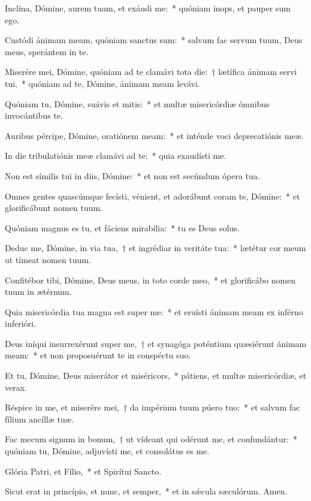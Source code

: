 \item Inclína, Dómine, aurem tuam, et exáudi me:~* quóniam inops, et pauper sum ego.

\item Custódi ánimam meam, quóniam sanctus sum:~* salvum fac servum tuum, Deus meus, sperántem in te.

\item Miserére mei, Dómine, quóniam ad te clamávi tota die:~† lætífica ánimam servi tui,~* quóniam ad te, Dómine, ánimam meam levávi.

\item Quóniam tu, Dómine, suávis et mitis:~* et multæ misericórdiæ ómnibus invocántibus te.

\item Auribus pércipe, Dómine, oratiónem meam:~* et inténde voci deprecatiónis meæ.

\item In die tribulatiónis meæ clamávi ad te:~* quia exaudísti me.

\item Non est símilis tui in diis, Dómine:~* et non est secúndum ópera tua.

\item Omnes gentes quascúmque fecísti, vénient, et adorábunt coram te, Dómine:~* et glorificábunt nomen tuum.

\item Quóniam magnus es tu, et fáciens mirabília:~* tu es Deus solus.

\item Deduc me, Dómine, in via tua,~† et ingrédiar in veritáte tua:~* lætétur cor meum ut tímeat nomen tuum.

\item Confitébor tibi, Dómine, Deus meus, in toto corde meo,~* et glorificábo nomen tuum in ætérnum.

\item Quia misericórdia tua magna est super me:~* et eruísti ánimam meam ex inférno inferióri.

\item Deus iníqui insurrexérunt super me,~† et synagóga poténtium quæsiérunt ánimam meam:~* et non proposuérunt te in conspéctu suo.

\item Et tu, Dómine, Deus miserátor et miséricors,~* pátiens, et multæ misericórdiæ, et verax.

\item Réspice in me, et miserére mei,~† da impérium tuum púero tuo:~* et salvum fac fílium ancíllæ tuæ.

\item Fac mecum signum in bonum,~† ut vídeant qui odérunt me, et confundántur:~* quóniam tu, Dómine, adjuvísti me, et consolátus es me.

\item Glória Patri, et Fílio,~* et Spirítui Sancto.

\item Sicut erat in princípio, et nunc, et semper,~* et in sǽcula sæculórum. Amen.

